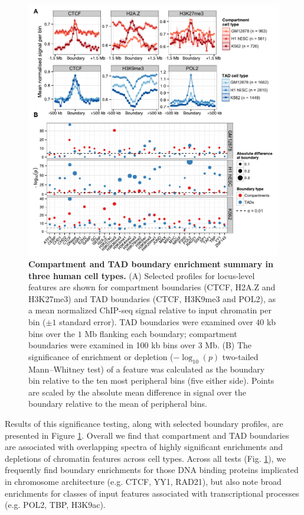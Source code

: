 \documentclass[a4paper,11pt,oneside]{book}
\begin{document}
\begin{figure}
\begin{center} 
\includegraphics[width=5.5in]{boundarysummary.pdf}
\captionsetup{width=\textwidth}
\caption[Compartment and TAD boundary enrichment summary in three human cell types.]{ {\bf Compartment and TAD boundary enrichment summary in three human cell types.}
(A) Selected profiles for locus-level features are shown for compartment boundaries (CTCF, H2A.Z and H3K27me3) and TAD boundaries (CTCF, H3K9me3 and POL2), as a mean normalized ChIP-seq signal relative to input chromatin per bin ($\pm1$ standard error). TAD boundaries were examined over $40$ kb bins over the $1$ Mb flanking each boundary; compartment boundaries were examined in 100 kb bins over $3$ Mb. (B) The significance of enrichment or depletion ($-\log_{10}(p)$ two-tailed Mann--Whitney test) of a feature was calculated as the boundary bin relative to the ten most peripheral bins (five either side). Points are scaled by the absolute mean difference in signal over the boundary relative to the mean of peripheral bins.
}\label{fig:boundarysummary}
\end{center}
\end{figure} 

Results of this significance testing, along with selected boundary profiles, are presented in Figure \ref{fig:boundarysummary}. Overall we find that compartment and TAD boundaries are associated with overlapping spectra of highly significant enrichments and depletions of chromatin features across cell types. Across all tests (Fig. \ref{fig:boundarysummary}), we frequently find boundary enrichments for those DNA binding proteins
implicated in chromosome architecture (e.g. CTCF, YY1, RAD21), but also note broad enrichments for classes of input features associated with transcriptional processes (e.g. POL2, TBP, H3K9ac). 
\end{document}
